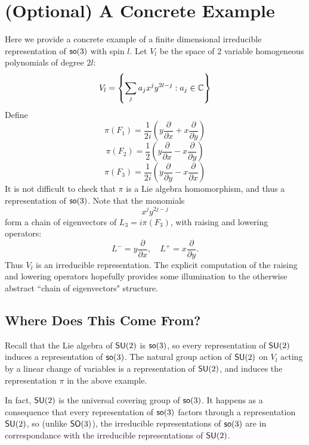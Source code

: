 \section{(Optional) A Concrete Example}
Here we provide a concrete example of a finite dimensional irreducible representation of $\operatorname{\textsf{so}}(3)$ with spin $l$. Let $V_l$ be the space of 2 variable homogeneous polynomials of degree $2l$:
\[
    V_l = \left\{ \sum_j a_j x^{j}y^{2l-j} : a_j \in {\mathbb C} \right\}
\]
Define
\[
    \pi(F_1) = \frac{1}{2i}\left(y \frac{\partial}{\partial x} + x \frac{\partial}{\partial y}\right)
\]
\[
    \pi(F_2) = \frac{1}{2}\left(y \frac{\partial}{\partial x} - x \frac{\partial}{\partial y}\right)
\]
\[
    \pi(F_3) = \frac{1}{2i}\left( y \frac{\partial}{\partial y} - x \frac{\partial}{\partial x}\right)
\]
It is not difficult to check that $\pi$ is a Lie algebra homomorphism, and thus a representation of $\operatorname{\textsf{so}}(3)$. Note that the monomials
\[
    x^jy^{2j-j}
\]
form a chain of eigenvectors of $L_3 = i\pi(F_3)$, with raising and lowering operators:
\[
    L^- = y \frac{\partial}{\partial x}, \quad L^+ = x \frac{\partial}{\partial y}.
\]
Thus $V_l$ is an irreducible representation. The explicit computation of the raising and lowering operators hopefully provides some illumination to the otherwise abstract ``chain of eigenvectors" structure.

\subsection{Where Does This Come From?}
Recall that the Lie algebra of $\operatorname{\textsf{SU}}(2)$ is $\operatorname{\textsf{so}}(3)$, so every representation of $\operatorname{\textsf{SU}}(2)$ induces a representation of $\operatorname{\textsf{so}}(3)$. The natural group action of $\operatorname{\textsf{SU}}(2)$ on $V_l$ acting by a linear change of variables is a representation of $\operatorname{\textsf{SU}}(2)$, and induces the representation $\pi$ in the above example.

\begin{remark}
    In fact, $\operatorname{\textsf{SU}}(2)$ is the universal covering group of $\operatorname{\textsf{so}}(3)$. It happens as a consequence that every representation of $\operatorname{\textsf{so}}(3)$ factors through a representation $\operatorname{\textsf{SU}}(2)$, so (unlike $\operatorname{\textsf{SO}}(3)$), the irreducible representations of $\operatorname{\textsf{so}}(3)$ are in correspondance with the irreducible representations of $\operatorname{\textsf{SU}}(2)$.
\end{remark}
